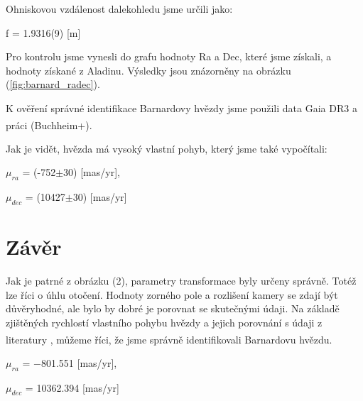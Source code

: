 \documentclass[a4paper,11pt]{article}
\begin{document}
\begin{minipage}[t]{0.5\textwidth}
                \par Ohniskovou vzdálenost dalekohledu jsme určili jako:

                \begin{center}
                    \par f = 1.9316(9) [m]
                \end{center}
                
                \par Pro kontrolu jsme vynesli do grafu hodnoty Ra a Dec, které jsme získali, a hodnoty získané z Aladinu. Výsledky jsou znázorněny na obrázku (\ref{fig:barnard_radec}).
                \par K ověření správné identifikace Barnardovy hvězdy jsme použili data Gaia DR3 a práci (Buchheim+)\textsuperscript{\cite{Buchheim}}.
                \par Jak je vidět, hvězda má vysoký vlastní pohyb, který jsme také vypočítali:
                \begin{center}
                    $\mu_{ra}$ = (-752$\pm$30) [mas/yr], 
                    \par $\mu_{dec}$ = (10427$\pm$30) [mas/yr]
                \end{center}
           
        \section{Závěr}
                Jak je patrné z obrázku (2), parametry transformace byly určeny správně. Totéž lze říci o úhlu otočení. Hodnoty zorného pole a rozlišení kamery se zdají být důvěryhodné, ale bylo by dobré je porovnat se skutečnými údaji. Na základě zjištěných rychlostí vlastního pohybu hvězdy a jejich porovnání s údaji z literatury \textsuperscript{\cite{Buchheim}}, můžeme říci, že jsme správně identifikovali Barnardovu hvězdu.

                \begin{center}
                    $\mu_{ra}$ = −801.551 [mas/yr], 
                    \par $\mu_{dec}$ = 10362.394 [mas/yr]
                \end{center}
    \end{minipage}
\newpage    
\end{document}
